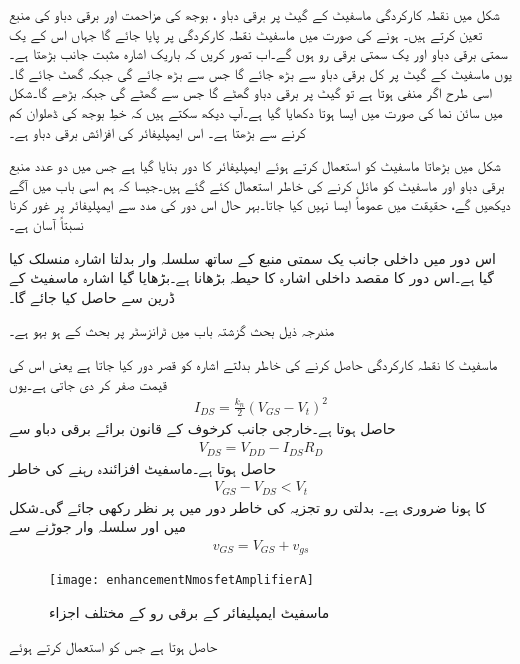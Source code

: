 شکل  میں نقطہ کارکردگی ماسفیٹ کے گیٹ پر برقی دباو ، بوجھ کی مزاحمت  اور برقی دباو کی منبع  تعین کرتے ہیں۔ ہونے کی صورت میں ماسفیٹ نقطہ کارکردگی پر پایا جائے گا جہاں اس کے یک سمتی برقی دباو  اور یک سمتی برقی رو  ہوں گے۔اب تصور کریں کہ باریک اشارہ  مثبت جانب بڑھتا ہے۔یوں ماسفیٹ کے گیٹ پر کل برقی دباو  سے بڑھ جائے گا جس سے   بڑھ جائے گی جبکہ  گھٹ جائے گا۔اسی طرح اگر  منفی ہوتا ہے تو گیٹ پر برقی دباو گھٹے گا جس سے  گھٹے گی جبکہ  بڑھے گا۔شکل میں سائن نما  کی صورت میں ایسا ہوتا دکھایا گیا ہے۔آپ دیکھ سکتے ہیں کہ خطِ بوجھ کی ڈھلوان کم کرنے سے  بڑھتا ہے۔ اس ایمپلیفائر کی افزائش برقی دباو  ہے۔

شکل   میں بڑھاتا ماسفیٹ کو استعمال کرتے ہوئے ایمپلیفائر کا دور بنایا گیا ہے جس میں دو عدد منبع برقی دباو   اور  ماسفیٹ کو مائل کرنے کی خاطر استعمال کئے گئے ہیں۔جیسا کہ ہم اسی باب میں آگے دیکھیں گے، حقیقت میں عموماً ایسا نہیں کیا جاتا۔بہر حال اس دور کی مدد سے ایمپلیفائر پر غور کرنا نسبتاً آسان ہے۔

اس دور میں داخلی جانب یک سمتی منبع  کے ساتھ سلسلہ وار بدلتا اشارہ  منسلک کیا گیا ہے۔اس دور کا مقصد داخلی اشارہ  کا حیطہ بڑھانا ہے۔بڑھایا گیا اشارہ ماسفیٹ کے ڈرین سے حاصل کیا جائے گا۔

مندرجہ ذیل بحث گزشتہ باب میں ٹرانزسٹر پر بحث کے ہو بہو ہے۔

 ماسفیٹ کا نقطہ کارکردگی حاصل کرنے کی خاطر بدلتے اشارہ کو قصر دور کیا جاتا ہے یعنی اس کی قیمت صفر کر دی جاتی ہے۔یوں
\begin{align} \label{مساوات_میدانی_یکسمتی_رو}
I_{DS}=\frac{k_n}{2} \left(V_{GS}-V_t \right )^2
\end{align}
حاصل ہوتا ہے۔خارجی جانب کرخوف کے قانون برائے برقی دباو سے
\begin{align} \label{مساوات_میدانی_یکسمتی_خارجی_دباو}
V_{DS}=V_{DD}-I_{DS}R_D
\end{align}
حاصل ہوتا ہے۔ماسفیٹ افزائندہ رہنے کی خاطر
\begin{align*}
V_{GS}-V_{DS}<V_t
\end{align*}
کا ہونا ضروری ہے۔
بدلتی رو تجزیہ کی خاطر دور میں  پر نظر رکھی جائے گی۔شکل   میں   اور  سلسلہ وار جوڑنے سے
\begin{align}
v_{GS}=V_{GS}+v_{gs}
\end{align}
%
\begin{figure}
\centering
\texttt{[image: enhancementNmosfetAmplifierA]}
\caption{ماسفیٹ ایمپلیفائر کے برقی رو کے مختلف اجزاء}
\label{شکل_ماسفیٹ_ایمپلیفائر_الف}
\end{figure}
حاصل ہوتا ہے جس کو استعمال کرتے ہوئے

